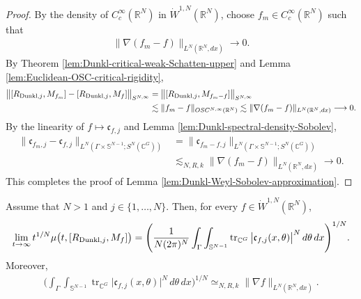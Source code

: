\documentclass{amsart}
\begin{document}
\begin{proof}
By the density of \(C_c^\infty(\mathbb R^N)\) in \(\dot W^{1,N}(\mathbb R^N)\), choose \(f_m\in C_c^\infty(\mathbb R^N)\) such that
\begin{align*}
\|\nabla(f_m-f)\|_{L^N(\mathbb R^N,dx)}
\longrightarrow0.
\end{align*}
By Theorem \ref{lem:Dunkl-critical-weak-Schatten-upper} and Lemma \ref{lem:Euclidean-OSC-critical-rigidity},
\begin{align*}
\big\|
[R_{{\rm Dunkl},j},M_{f_m}]
-
[R_{{\rm Dunkl},j},M_f]
\big\|_{S^{N,\infty}}
&=
\big\|
[R_{{\rm Dunkl},j},M_{f_m-f}]
\big\|_{S^{N,\infty}}\\
&\lesssim
\|f_m-f\|_{OSC^{N,\infty}(\mathbb R^N)}
\lesssim
\|\nabla(f_m-f)\|_{L^N(\mathbb R^N,dx)}
\longrightarrow0.
\end{align*}
By the linearity of \(f\mapsto\mathfrak c_{f,j}\) and Lemma \ref{lem:Dunkl-spectral-density-Sobolev},
\begin{align*}
\|\mathfrak c_{f_m,j}-\mathfrak c_{f,j}\|_
{L^N(\Gamma\times\mathbb S^{N-1};S^N(\mathbb C^G))}
&=
\|\mathfrak c_{f_m-f,j}\|_
{L^N(\Gamma\times\mathbb S^{N-1};S^N(\mathbb C^G))}\\
&\lesssim_{N,R,k}
\|\nabla(f_m-f)\|_{L^N(\mathbb R^N,dx)}
\longrightarrow0.
\end{align*}
This completes the proof of Lemma \ref{lem:Dunkl-Weyl-Sobolev-approximation}.
\end{proof}

\begin{theorem}\label{thm:Dunkl-Riesz-spectral-asymptotic}
Assume that \(N>1\) and \(j\in\{1,\ldots,N\}\). Then, for every
\(f\in\dot W^{1,N}(\mathbb R^N)\),
\begin{align}
\lim_{t\to\infty}
t^{1/N}
\mu
\big(
t,[R_{{\rm Dunkl},j},M_f]
\big)
=
\Bigg(
\frac{1}{N(2\pi)^N}
\int_\Gamma
\int_{\mathbb S^{N-1}}
\operatorname{tr}_{\mathbb C^G}
\big|
\mathfrak c_{f,j}(x,\theta)
\big|^N
\,d\theta\,dx
\Bigg)^{1/N}.
\label{eq:Dunkl-Riesz-spectral-asymptotic}
\end{align}
Moreover,
\begin{align}
\Bigg(
\int_\Gamma
\int_{\mathbb S^{N-1}}
\operatorname{tr}_{\mathbb C^G}
\big|
\mathfrak c_{f,j}(x,\theta)
\big|^N
\,d\theta\,dx
\Bigg)^{1/N}
\simeq_{N,R,k}
\|\nabla f\|_{L^N(\mathbb R^N,dx)}.
\label{eq:Dunkl-Riesz-spectral-coefficient-Sobolev}
\end{align}
\end{theorem}
\end{document}
